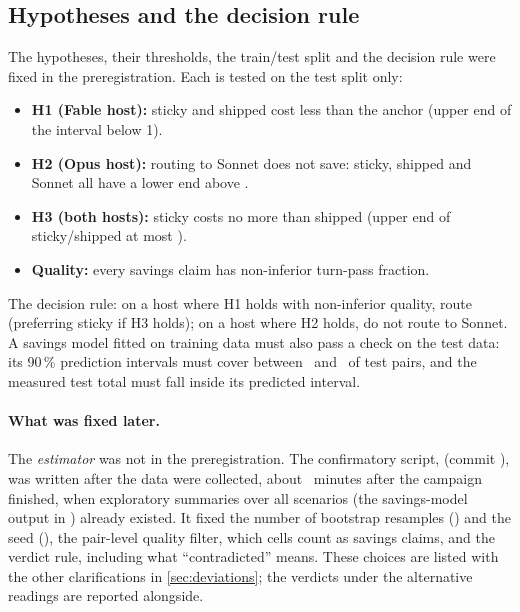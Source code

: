 \begin{table}[htbp]
\centering\scriptsize
\caption{Tools normalization by host and arm: first requests per model that found the tool prefix cold or warm, and
the dollars moved from the write rate to the read rate.}
\label{tab:toolsnorm}

\end{table}

\begin{table}[htbp]
\centering\small
\caption{Confirmatory cost ratios (test split, pair reading) on the raw and the tools-normalized basis.}
\label{tab:toolsratios}

\end{table}

\subsection{Hypotheses and the decision rule}

The hypotheses, their thresholds, the train/test split and the decision rule were fixed in the
preregistration. Each is tested on the test split only:
\begin{itemize}
  \item \textbf{H1 (Fable host):} sticky and shipped cost less than the anchor (upper end of the interval
    below 1).
  \item \textbf{H2 (Opus host):} routing to Sonnet does not save: sticky, shipped and Sonnet all have a
    lower end above \HTwoLower.
  \item \textbf{H3 (both hosts):} sticky costs no more than shipped (upper end of sticky/shipped at most
    \HThreeUpper).
  \item \textbf{Quality:} every savings claim has non-inferior turn-pass fraction.
\end{itemize}
The decision rule: on a host where H1 holds with non-inferior quality, route (preferring sticky if H3
holds); on a host where H2 holds, do not route to Sonnet. A savings model fitted on training data must
also pass a check on the test data: its 90\,\% prediction intervals must cover between \CovLow\ and
\CovHigh\ of test pairs, and the measured test total must fall inside its predicted interval.

\paragraph{What was fixed later.} The \emph{estimator} was not in the preregistration. The confirmatory
script,  (commit \code{\ConfirmSha}), was written after the data were
collected, about \ConfirmAfterMin\ minutes after the campaign finished, when exploratory summaries over all
scenarios (the savings-model output in ) already existed. It fixed the number of bootstrap
resamples (\Boot) and the seed (\BootSeed), the pair-level quality filter, which cells count as savings
claims, and the verdict rule, including what ``contradicted'' means. These choices are listed with the other
clarifications in \cref{sec:deviations}; the verdicts under the alternative readings are reported alongside.

